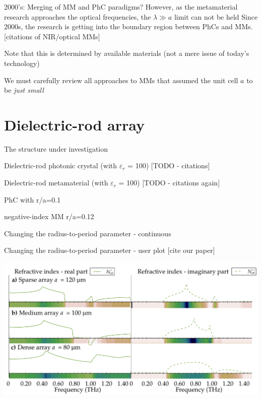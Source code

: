 \documentclass[t]{beamer} \usepackage[english]{babel} \usepackage[utf8]{inputenc} \usetheme{Frankfurt} %
\begin{document}
\begin{frame}{2000's: Merging of MM and PhC paradigms?} 		%
However, as the metamaterial research approaches the optical frequencies,  the $\lambda \gg a$ limit can not be held
Since 2000s, the research is getting into the boundary region between PhCs and MMs. [citations of NIR/optical MMs] 

Note that this is determined by available materials (not a mere issue of today's technology)

We must carefully review all approaches to MMs that assumed the unit cell $a$ to be \textit{just small}
\end{frame} 		%


\section{Dielectric-rod array}

\begin{frame}{The structure under investigation}	%

Dielectric-rod photonic crystal (with $\varepsilon_r$ = 100)  [TODO - citations]

Dielectric-rod metamaterial (with $\varepsilon_r$ = 100) [TODO - citations again]

\end{frame} 		%

\begin{frame}{}	%
PhC with r/a=0.1
\end{frame} 		%

\begin{frame}{}	%
negative-index MM r/a=0.12

\end{frame} 		%

\begin{frame}{}	%
Changing the radius-to-period parameter - continuous

\end{frame} 		%

\begin{frame}{}	%
Changing the radius-to-period parameter - user plot [cite our paper]

\includegraphics[width=1.\framewidth]{../img/ERods_sketch_of_separate_spectra_to_continuous_scan.pdf}

\end{frame} 		%
\end{document}
